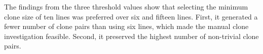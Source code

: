 \documentclass[10pt,journal,compsoc]{IEEEtran}
\begin{document}
The findings from the three threshold values show that selecting the minimum clone size 
of ten lines was preferred over six and fifteen lines. First, it generated 
a fewer number of clone pairs than using six lines, which made the manual clone
investigation feasible. Second, it preserved the highest number of non-trivial clone
pairs.
%
%
%
%
\end{document}
